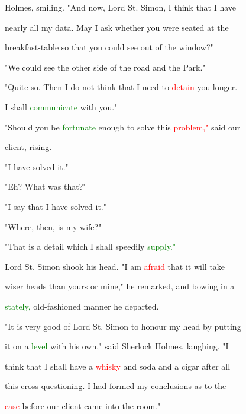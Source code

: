  Holmes, \textcolor{BurntOrange}{smiling.} "And now, \textcolor{BurntOrange}{Lord} St. Simon, I think that I have

 nearly all my data. May I ask whether you were seated at the

 breakfast-table so that you could see out of the window?"



 "We could see the other side of the road and the Park."



 "Quite so. Then I do not think that I need to \textcolor{red}{detain} you longer.

 I shall \textcolor{green}{communicate} with you."



 "Should you be \textcolor{green}{fortunate} enough to solve this \textcolor{red}{problem,"} said our

 client, rising.



 "I have solved it."



 "Eh? What was that?"



 "I say that I have solved it."



 "Where, then, is my wife?"



 "That is a detail which I shall speedily \textcolor{green}{supply."}



 \textcolor{BurntOrange}{Lord} St. Simon shook his head. "I am \textcolor{red}{afraid} that it will take

 wiser heads than yours or mine," he remarked, and bowing in a

 \textcolor{green}{stately,} old-fashioned manner he \textcolor{BurntOrange}{departed.}



 "It is very \textcolor{BurntOrange}{good} of \textcolor{BurntOrange}{Lord} St. Simon to honour my head by putting

 it on a \textcolor{green}{level} with his own," said Sherlock Holmes, \textcolor{BurntOrange}{laughing.} "I

 think that I shall have a \textcolor{red}{whisky} and soda and a cigar after all

 this cross-questioning. I had formed my conclusions as to the

 \textcolor{red}{case} before our client came into the room."



